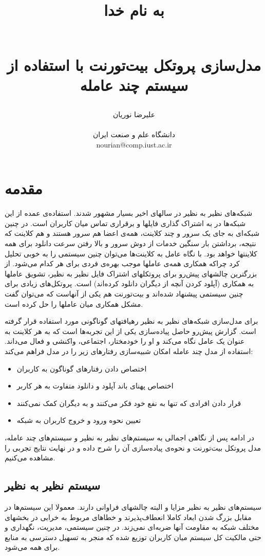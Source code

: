 \documentclass{article}
\title{
\begin{normalsize} به نام خدا \end{normalsize}
\\[2cm]
 مدل‌سازی پروتکل بیت‌تورنت با استفاده از سیستم چند عامله
}
\author{علیرضا نوریان
\\
\\ \small دانشگاه علم و صنعت ایران
\\ \small nourian@comp.iust.ac.ir
}
\begin{document}
\maketitle

\section{مقدمه}
شبکه‌های نظیر به نظیر در سالهای اخیر بسیار مشهور شدند. استفاده‌ی عمده از این شبکه‌ها در به اشتراک گذاری فایلها و برقراری تماس میان کاربران است. در چنین شبکه‌ای به جای یک سرور و چند کلاینت، همه‌ی اعضا هم سرور هستند و هم کلاینت که نتیجه، برداشتن بار سنگین خدمات از دوش سرور و بالا رفتن سرعت دانلود برای همه کلاینتها خواهد بود. با نگاه عامل به کلاینت‌ها می‌توان چنین سیستمی را به خوبی تحلیل کرد چراکه همکاری  همه‌ی عاملها موجب بهره‌ی فردی برای هر کدام می‌شود. از بزرگترین چالشهای پیش‌رو برای پروتکلهای اشتراک فایل نظیر به نظیر، تشویق عاملها به همکاری (آپلود کردن آنچه از دیگران دانلود کرده‌اند) است. پروتکل‌های زیادی برای چنین سیستمی پیشنهاد شده‌اند و بیت‌تورنت هم یکی از آنهاست که می‌توان گفت مشکل همکاری میان عاملها را حل کرده است.

برای مدل‌سازی شبکه‌های نظیر به نظیر رهیافتهای گوناگونی مورد استفاده قرار گرفته است. گزارش پیش‌رو حاصل پیاده‌سازی یکی از این تجربه‌ها\cite{mas-torrent} است که به هر کلاینت به عنوان یک عامل نگاه می‌کند و او را خودمختار، اجتماعی، واکنشی و فعال می‌داند. استفاده از مدل چند عامله امکان شبیه‌سازی رفتارهای زیر را در مدل فراهم می‌کند:
\begin{itemize}
\item
اختصاص دادن رفتارهای گوناگون به کاربران
\item
اختصاص پهنای باند آپلود و دانلود متفاوت به هر کاربر
\item
قرار دادن افرادی که تنها به نفع خود فکر می‌کنند و به دیگران کمک نمی‌کنند
\item
تعیین نحوه ورود و خروج کاربران به شبکه
\end{itemize}

در ادامه پس از نگاهی اجمالی به سیستم‌های نظیر به نظیر و سیستم‌های چند عامله، مدل پروتکل بیت‌تورنت و نحوه‌ی پیاده‌سازی آن را شرح داده و در نهایت نتایج تجربی را مشاهده می‌کنیم. 

\subsection{سیستم نظیر به نظیر}
سیستم‌های نظیر به نظیر مزایا و البته چالشهای فراوانی دارند. معمولا این سیستم‌ها در مقابل بزرگ شدن ابعاد کاملا انعطاف‌پذیرند و خطاهای مربوط به خرابی در بخشهای مختلف شبکه به مقاومت آنها ضربه‌ای نمی‌زند. در چنین سیستمی، مدیریت، نگهداری و حتی مالکیت کل سیستم میان کاربران توزیع شده که منجر به تسهیل دسترسی به منابع برای همه می‌شود.
\end{document}
